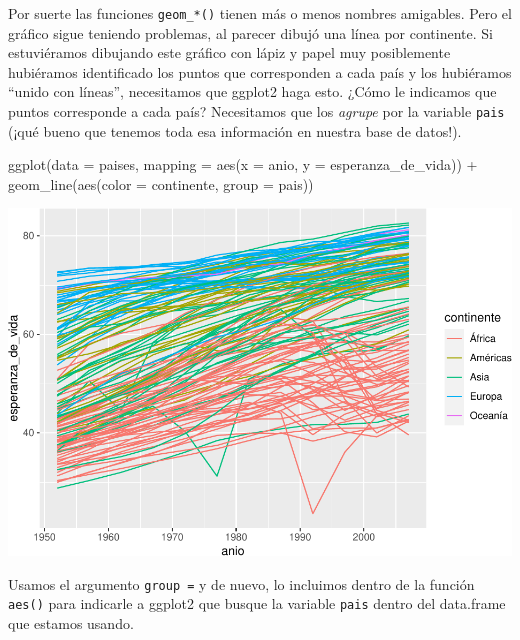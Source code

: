 \documentclass[
  openany]{book}
\newenvironment{Shaded}{\begin{snugshade}}{\end{snugshade}}
\newcommand{\AttributeTok}[1]{\textcolor[rgb]{0.77,0.63,0.00}{#1}}
\newcommand{\FunctionTok}[1]{\textcolor[rgb]{0.00,0.00,0.00}{#1}}
\newcommand{\NormalTok}[1]{#1}
\newcommand{\SpecialCharTok}[1]{\textcolor[rgb]{0.00,0.00,0.00}{#1}}
\begin{document}
Por suerte las funciones \texttt{geom\_*()} tienen más o menos nombres amigables.
Pero el gráfico sigue teniendo problemas, al parecer dibujó una línea por continente.
Si estuviéramos dibujando este gráfico con lápiz y papel muy posiblemente hubiéramos identificado los puntos que corresponden a cada país y los hubiéramos ``unido con líneas'', necesitamos que ggplot2 haga esto.
¿Cómo le indicamos que puntos corresponde a cada país?
Necesitamos que los \emph{agrupe} por la variable \texttt{pais} (¡qué bueno que tenemos toda esa información en nuestra base de datos!).

\begin{Shaded}
\begin{Highlighting}[]
\FunctionTok{ggplot}\NormalTok{(}\AttributeTok{data =}\NormalTok{ paises, }\AttributeTok{mapping =} \FunctionTok{aes}\NormalTok{(}\AttributeTok{x =}\NormalTok{ anio, }\AttributeTok{y =}\NormalTok{ esperanza\_de\_vida)) }\SpecialCharTok{+}
  \FunctionTok{geom\_line}\NormalTok{(}\FunctionTok{aes}\NormalTok{(}\AttributeTok{color =}\NormalTok{ continente, }\AttributeTok{group =}\NormalTok{ pais))}
\end{Highlighting}
\end{Shaded}

\begin{center}\includegraphics[width=1\linewidth]{DT6_files/figure-latex/unnamed-chunk-52-1} \end{center}

Usamos el argumento \texttt{group\ =} y de nuevo, lo incluimos dentro de la función \texttt{aes()} para indicarle a ggplot2 que busque la variable \texttt{pais} dentro del data.frame que estamos usando.
\end{document}
